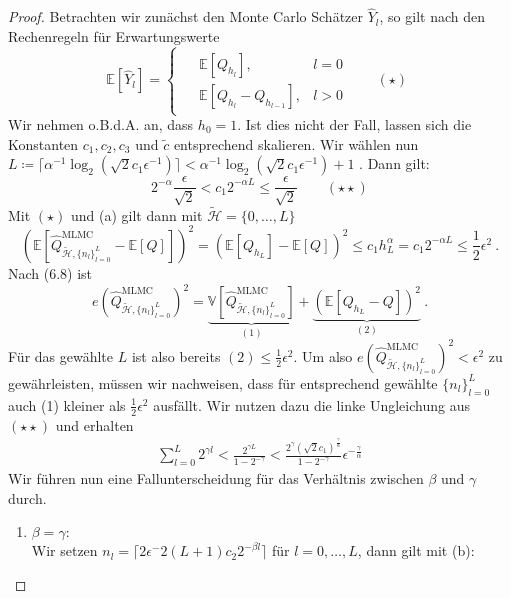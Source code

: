 \begin{proof}
	Betrachten wir zunächst den Monte Carlo Schätzer $ \widehat{Y}_l $, so gilt nach den Rechenregeln für Erwartungswerte 
	\[
		\mathbb{E}[\widehat{Y}_l] = 
			\begin{cases}
				\begin{array}{llr}
						&\mathbb{E}[Q_{h_l}] , &l=0 \\
						&\mathbb{E}[Q_{h_l}-Q_{h_{l-1}}] , &l>0
				\end{array} \qquad (\star)
			\end{cases}
	\]
	Wir nehmen o.B.d.A. an, dass $ h_0 = 1 $. Ist dies nicht der Fall, lassen sich die Konstanten $ c_1,c_2,c_3 $ und $ \tilde{c} $ entsprechend skalieren.
	Wir wählen nun $ L \coloneqq \lceil \alpha^{-1} \log_2 (\sqrt{2}c_1\epsilon^{-1}) \rceil < \alpha^{-1} \log_2 (\sqrt{2}c_1\epsilon^{-1}) +1 $ . 
	Dann gilt:
	\[
	2^{-\alpha} \frac{\epsilon}{\sqrt{2}} < c_1 2^{-\alpha  L} \leq \frac{\epsilon}{\sqrt{2}}  \qquad (\star \star)
	\]
	Mit $ (\star) $ und (a) gilt dann mit $ \tilde{\mathcal{H}} = \{0,\dots,L\} $
	\[
	\left( \mathbb{E}[\widehat{Q}_{\tilde{\mathcal{H}},\{ n_l \}_{l=0}^L }^{\text{MLMC}} - \mathbb{E}[Q]] \right)^2 = \left( \mathbb{E}[Q_{h_L}] - \mathbb{E}[Q] \right)^2  \leq c_1 h_L^{\alpha} = c_1 2^{-\alpha L} \leq \frac{1}{2} \epsilon^2 \ .
	\]
	Nach (6.8) ist
	\[ 
	 	e(\widehat{Q}_{\tilde{\mathcal{H}},\{ n_l \}_{l=0}^L }^{\text{MLMC}})^2 	= \underbrace{	\mathbb{V}[\widehat{Q}_{\tilde{\mathcal{H}},\{ n_l \}_{l=0}^L }^{\text{MLMC}}]}_{(1)} + \underbrace{\left( \mathbb{E}[Q_{h_L}-Q] \right)^2}_{(2)}	\ .
	\]
	Für das gewählte $ L $ ist also bereits $ (2) \leq \frac{1}{2}\epsilon^2 $.
	Um also $ e(\widehat{Q}_{\tilde{\mathcal{H}},\{ n_l \}_{l=0}^L }^{\text{MLMC}})^2 < \epsilon^2 $ zu gewährleisten, müssen wir nachweisen, dass für entsprechend gewählte $ \{n_l\}_{l=0}^L $ auch (1) kleiner als $ \frac{1}{2}\epsilon^2 $ ausfällt.
	Wir nutzen dazu die linke Ungleichung aus $ (\star \star) $ und erhalten 
	\begin{align}
		\sum_{l=0}^{L} 2^{\gamma l} < \frac{2^{\gamma L}}{1 - 2^{- \gamma}} < \frac{2^{\gamma}(\sqrt{2}c_1)^{ \frac{\gamma }{\alpha} }}{1-2^{-\gamma}} \epsilon^{-\frac{\gamma}{\alpha}}
	\end{align}
	Wir führen nun eine Fallunterscheidung für das Verhältnis zwischen $ \beta $ und $ \gamma $ durch.
	\begin{enumerate}[label=(\roman*)]
		\item $ \beta = \gamma \colon $\\
		Wir setzen $ n_l = \lceil 2\epsilon^-2(L+1)c_2 2^{-\beta l} \rceil $ für $ l= 0,\dots,L $, dann gilt mit (b):

\end{enumerate}
\end{proof}
